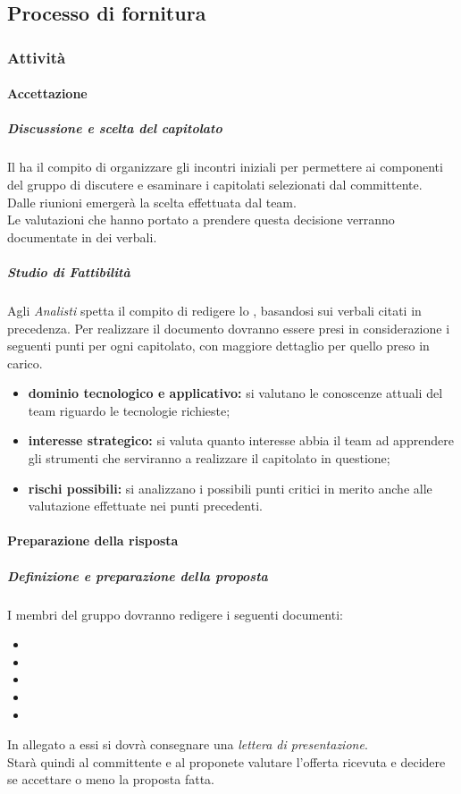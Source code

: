 	\subsection{Processo di fornitura}
		\subsubsection{Attività}
		
			\paragraph{Accettazione}
				\subparagraph{Discussione e scelta del capitolato}
Il \roleProjectManager{} ha il compito di organizzare	gli incontri iniziali per permettere ai componenti del gruppo di discutere e esaminare i capitolati selezionati dal committente. \\
Dalle riunioni emergerà la scelta effettuata dal team. \\
Le valutazioni che hanno portato a prendere questa decisione verranno documentate in dei verbali.
				\subparagraph{Studio di Fattibilità}
Agli \emph{Analisti} spetta il compito di redigere lo \docNameVersionSdF{}, basandosi sui verbali citati in precedenza.
Per realizzare il documento dovranno essere presi in considerazione i seguenti punti per ogni capitolato, con maggiore dettaglio per quello preso in carico.
					\begin{itemize}
						\item \textbf{dominio tecnologico e applicativo:} si valutano le conoscenze attuali del team riguardo le tecnologie richieste;
						\item \textbf{interesse strategico:} si valuta quanto interesse abbia il team ad apprendere gli strumenti che serviranno a realizzare il capitolato in questione;
						\item \textbf{rischi possibili:} si analizzano i possibili punti critici in merito anche alle valutazione effettuate nei punti precedenti.
					\end{itemize}
			\paragraph{Preparazione della risposta}
				\subparagraph{Definizione e preparazione della proposta}
I membri del gruppo \groupName{} dovranno redigere i seguenti documenti: \\
					\begin{itemize}
						\item \docNameVersionSdF
						\item \docNameVersionAdR
						\item \docNameVersionPdP
						\item \docNameVersionPdQ
						\item \docNameVersionNdP
					\end{itemize}
In allegato a essi si dovrà consegnare una \emph{lettera di presentazione}. \\
Starà quindi al committente e al proponete valutare l'offerta ricevuta e decidere se accettare o meno la proposta fatta.
					
